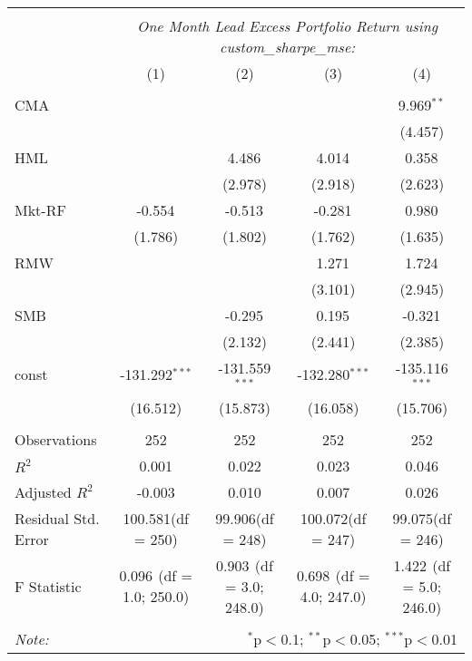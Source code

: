 \begin{table}[!htbp] \centering
\begin{tabular}{@{\extracolsep{5pt}}lcccc}
\\[-1.8ex]\hline
\hline \\[-1.8ex]
& \multicolumn{4}{c}{\textit{One Month Lead Excess Portfolio Return using custom_sharpe_mse:}} \
\cr \cline{4-5}
\\[-1.8ex] & (1) & (2) & (3) & (4) \\
\hline \\[-1.8ex]
 CMA & & & & 9.969$^{**}$ \\
  & & & & (4.457) \\
 HML & & 4.486$^{}$ & 4.014$^{}$ & 0.358$^{}$ \\
  & & (2.978) & (2.918) & (2.623) \\
 Mkt-RF & -0.554$^{}$ & -0.513$^{}$ & -0.281$^{}$ & 0.980$^{}$ \\
  & (1.786) & (1.802) & (1.762) & (1.635) \\
 RMW & & & 1.271$^{}$ & 1.724$^{}$ \\
  & & & (3.101) & (2.945) \\
 SMB & & -0.295$^{}$ & 0.195$^{}$ & -0.321$^{}$ \\
  & & (2.132) & (2.441) & (2.385) \\
 const & -131.292$^{***}$ & -131.559$^{***}$ & -132.280$^{***}$ & -135.116$^{***}$ \\
  & (16.512) & (15.873) & (16.058) & (15.706) \\
\hline \\[-1.8ex]
 Observations & 252 & 252 & 252 & 252 \\
 $R^2$ & 0.001 & 0.022 & 0.023 & 0.046 \\
 Adjusted $R^2$ & -0.003 & 0.010 & 0.007 & 0.026 \\
 Residual Std. Error & 100.581(df = 250) & 99.906(df = 248) & 100.072(df = 247) & 99.075(df = 246)  \\
 F Statistic & 0.096$^{}$ (df = 1.0; 250.0) & 0.903$^{}$ (df = 3.0; 248.0) & 0.698$^{}$ (df = 4.0; 247.0) & 1.422$^{}$ (df = 5.0; 246.0) \\
\hline
\hline \\[-1.8ex]
\textit{Note:} & \multicolumn{4}{r}{$^{*}$p$<$0.1; $^{**}$p$<$0.05; $^{***}$p$<$0.01} \\
\end{tabular}
\end{table}

